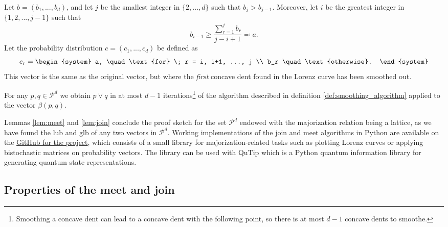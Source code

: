 \begin{definition} \label{def:smoothing_algorithm}
    Let $b = (b_1, ..., b_d)$, and let $j$ be the smallest integer in $\{2,...,d\}$ such that $b_j > b_{j-1}$. Moreover, let $i$ be the greatest integer in $\{1, 2, ..., j-1\}$ such that
    \begin{equation}
        b_{i-1} \geq \frac{\sum_{r=1}^{j}b_r}{j-i+1} \eqqcolon a.
    \end{equation}
    Let the probability distribution $c = (c_1, ..., c_d)$ be defined as
    \begin{equation}
        c_r = \begin{system}
                a, \quad \text{for} \; r = i, i+1, ..., j \\ %
                b_r \quad \text{otherwise}.
              \end{system}
    \end{equation}
    This vector is the same as the original vector, but where the \textit{first} concave dent found in the Lorenz curve has been smoothed out.
\end{definition}

\begin{lemma} \label{lem:join}
    For any $p, q \in \mathcal{P}^d$ we obtain $p \vee q$ in at most $d-1$ iterations\footnote{Smoothing a concave dent can lead to a concave dent with the following point, so there is at most $d-1$ concave dents to smoothe.} of the algorithm described in definition \ref{def:smoothing_algorithm} applied to the vector $\beta(p, q)$.
\end{lemma}

Lemmas \ref{lem:meet} and \ref{lem:join} conclude the proof sketch for the set $\mathcal{P}^d$ endowed with the majorization relation being a lattice, as we have found the lub and glb of any two vectors in $\mathcal{P}^d$. Working implementations of the join and meet algorithms in Python are available on the \href{https://github.com/traaldbjerg/MajoLat}{GitHub for the project}, which consists of a small library for majorization-related tasks such as plotting Lorenz curves or applying bistochastic matrices on probability vectors. The library can be used with QuTip which is a Python quantum information library for generating quantum state representations.


 
\subsection{Properties of the meet and join}


